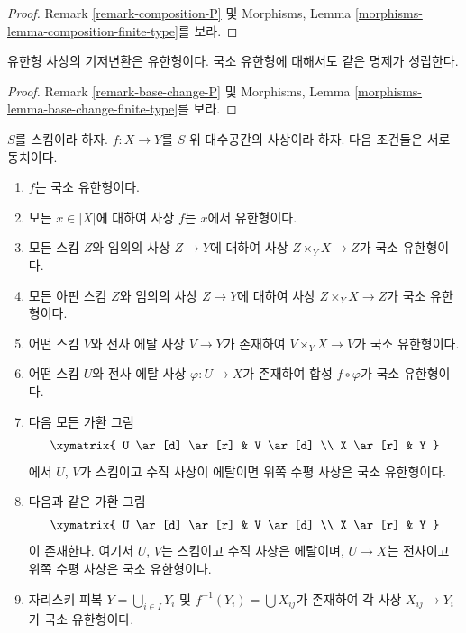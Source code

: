 \begin{proof}
Remark \ref{remark-composition-P} 및 Morphisms, Lemma
\ref{morphisms-lemma-composition-finite-type}를 보라.
\end{proof}

\begin{lemma}
\label{lemma-base-change-finite-type}
유한형 사상의 기저변환은 유한형이다.
국소 유한형에 대해서도 같은 명제가 성립한다.
\end{lemma}

\begin{proof}
Remark \ref{remark-base-change-P} 및 Morphisms, Lemma
\ref{morphisms-lemma-base-change-finite-type}를 보라.
\end{proof}

\begin{lemma}
\label{lemma-finite-type-local}
$S$를 스킴이라 하자.
$f : X \to Y$를 $S$ 위 대수공간의 사상이라 하자.
다음 조건들은 서로 동치이다.
\begin{enumerate}
\item $f$는 국소 유한형이다.
\item 모든 $x \in |X|$에 대하여 사상 $f$는 $x$에서 유한형이다.
\item 모든 스킴 $Z$와 임의의 사상 $Z \to Y$에 대하여 사상
$Z \times_Y X \to Z$가 국소 유한형이다.
\item 모든 아핀 스킴 $Z$와 임의의 사상
$Z \to Y$에 대하여 사상 $Z \times_Y X \to Z$가 국소 유한형이다.
\item 어떤 스킴 $V$와 전사 에탈 사상
$V \to Y$가 존재하여 $V \times_Y X \to V$가 국소 유한형이다.
\item 어떤 스킴 $U$와 전사 에탈 사상
$\varphi : U \to X$가 존재하여 합성 $f \circ \varphi$가
국소 유한형이다.
\item 다음 모든 가환 그림
$$
\xymatrix{
U \ar[d] \ar[r] & V \ar[d] \\
X \ar[r] & Y
}
$$
에서 $U$, $V$가 스킴이고 수직 사상이 에탈이면 위쪽 수평 사상은
국소 유한형이다.
\item 다음과 같은 가환 그림
$$
\xymatrix{
U \ar[d] \ar[r] & V \ar[d] \\
X \ar[r] & Y
}
$$
이 존재한다. 여기서 $U$, $V$는 스킴이고 수직 사상은 에탈이며,
$U \to X$는 전사이고 위쪽 수평 사상은 국소 유한형이다.
\item 자리스키 피복 $Y = \bigcup_{i \in I} Y_i$ 및
$f^{-1}(Y_i) = \bigcup X_{ij}$가 존재하여 각 사상
$X_{ij} \to Y_i$가 국소 유한형이다.
\end{enumerate}
\end{lemma}

